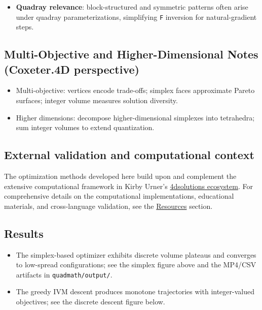 \documentclass[
  10pt,
]{article}
\newcommand{\passthrough}[1]{#1}
\providecommand{\tightlist}{%
  \setlength{\itemsep}{0pt}\setlength{\parskip}{0pt}}
\begin{document}
\begin{itemize}
\tightlist
\item
  \textbf{Quadray relevance}: block-structured and symmetric patterns
  often arise under quadray parameterizations, simplifying
  \passthrough{\lstinline!F!} inversion for natural-gradient steps.
\end{itemize}

\hypertarget{multi-objective-and-higher-dimensional-notes-coxeter.4d-perspective}{%
\subsection{Multi-Objective and Higher-Dimensional Notes (Coxeter.4D
perspective)}\label{multi-objective-and-higher-dimensional-notes-coxeter.4d-perspective}}

\begin{itemize}
\tightlist
\item
  Multi-objective: vertices encode trade-offs; simplex faces approximate
  Pareto surfaces; integer volume measures solution diversity.
\item
  Higher dimensions: decompose higher-dimensional simplexes into
  tetrahedra; sum integer volumes to extend quantization.
\end{itemize}

\hypertarget{external-validation-and-computational-context}{%
\subsection{External validation and computational
context}\label{external-validation-and-computational-context}}

The optimization methods developed here build upon and complement the
extensive computational framework in Kirby Urner's
\href{https://github.com/4dsolutions}{4dsolutions ecosystem}. For
comprehensive details on the computational implementations, educational
materials, and cross-language validation, see the
\href{07_resources.md}{Resources} section.

\hypertarget{results}{%
\subsection{Results}\label{results}}

\begin{itemize}
\tightlist
\item
  The simplex-based optimizer exhibits discrete volume plateaus and
  converges to low-spread configurations; see the simplex figure above
  and the MP4/CSV artifacts in
  \passthrough{\lstinline!quadmath/output/!}.
\item
  The greedy IVM descent produces monotone trajectories with
  integer-valued objectives; see the discrete descent figure below.
\end{itemize}
\end{document}
